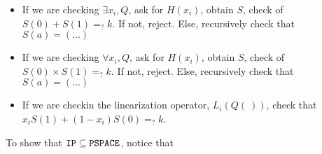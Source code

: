 \begin{itemize}
\item If we are checking $\exists x_i, Q$, ask for $H(x_i)$, obtain $S$, check of $S(0) + S(1) =_? k$.
If not, reject. Else, recursively check that $S(a) = (\dots)$


\item If we are checking $\forall x_i, Q$, ask for $H(x_i)$, obtain $S$, check of $S(0) \times S(1) =_? k$.
If not, reject. Else, recursively check that $S(a) = (\dots)$

\item If we are checkin the linearization operator, $L_i(Q(~))$, check that $x_i S(1) + (1 - x_i) S(0) =_? k$.
\end{itemize}


To show that $\texttt{IP} \subseteq \texttt{PSPACE}$, notice that 
